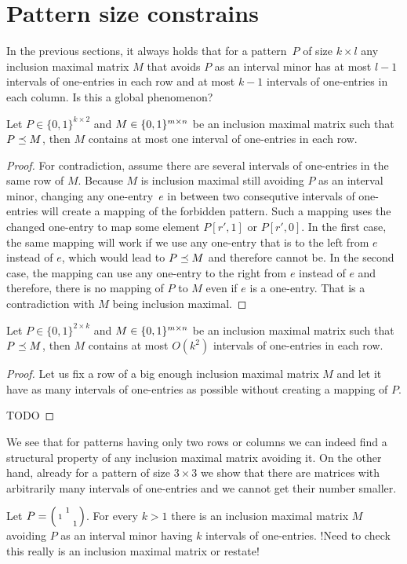 \section{Pattern size constrains}
In the previous sections, it always holds that for a pattern~$P$ of size $k\times l$ any inclusion maximal matrix $M$ that avoids $P$ as an interval minor has at most $l-1$ intervals of one-entries in each row and at most $k-1$ intervals of one-entries in each column. Is this a global phenomenon?

\begin{thm}
Let $P\in\{0,1\}^{k\times2}$ and $M\in\{0,1\}^{m\times n}$ be an inclusion maximal matrix such that $P\preceq M$, then $M$ contains at most one interval of one-entries in each row.
\end{thm}
\begin{proof}
For contradiction, assume there are several intervals of one-entries in the same row of $M$. Because $M$ is inclusion maximal still avoiding $P$ as an interval minor, changing any one-entry~$e$ in between two consequtive intervals of one-entries will create a mapping of the forbidden pattern. Such a mapping uses the changed one-entry to map some element $P[r',1]$ or $P[r',0]$. In the first case, the same mapping will work if we use any one-entry that is to the left from $e$ instead of $e$, which would lead to $P\preceq M$ and therefore cannot be. In the second case, the mapping can use any one-entry to the right from $e$ instead of $e$ and therefore, there is no mapping of $P$ to $M$ even if $e$ is a one-entry. That is a contradiction with $M$ being inclusion maximal.
\end{proof}
\begin{thm}
\label{smallintnum}
Let $P\in\{0,1\}^{2\times k}$ and $M\in\{0,1\}^{m\times n}$ be an inclusion maximal matrix such that $P\preceq M$, then $M$ contains at most $O(k^2)$ intervals of one-entries in each row.
\end{thm}
\begin{proof}
Let us fix a row of a big enough inclusion maximal matrix $M$ and let it have as many intervals of one-entries as possible without creating a mapping of $P$.

TODO
\end{proof}
We see that for patterns having only two rows or columns we can indeed find a structural property of any inclusion maximal matrix avoiding it. On the other hand, already for a pattern of size $3\times3$ we show that there are matrices with arbitrarily many intervals of one-entries and we cannot get their number smaller.
\begin{thm}
\label{manyints}
Let $P=\left(\begin{smallmatrix} &1& \\1& & \\ & &1\end{smallmatrix}\right)$. For every $k>1$ there is an inclusion maximal matrix $M$ avoiding $P$ as an interval minor having $k$ intervals of one-entries.
!Need to check this really is an inclusion maximal matrix or restate!
\end{thm}
